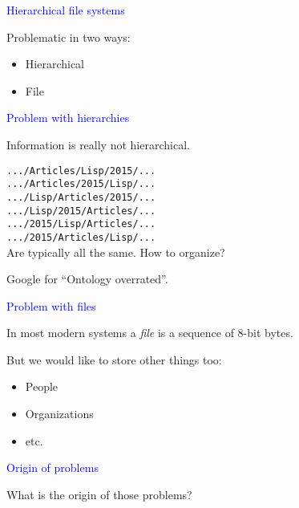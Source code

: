 \documentclass{slides}
\newcommand{\ti}[1]{\begin{center}\Large{\textcolor{blue}{#1}}\end{center}}
\begin{document}
\begin{slide}\ti{Hierarchical file systems}
\vskip 0.5cm
Problematic in two ways:

\begin{itemize}
\item Hierarchical
\item File
\end{itemize}

\vfill\end{slide}
\begin{slide}\ti{Problem with hierarchies}
\vskip 0.5cm
Information is really not hierarchical. 

\texttt{.../Articles/Lisp/2015/...}\\
\texttt{.../Articles/2015/Lisp/...}\\
\texttt{.../Lisp/Articles/2015/...}\\
\texttt{.../Lisp/2015/Articles/...}\\
\texttt{.../2015/Lisp/Articles/...}\\
\texttt{.../2015/Articles/Lisp/...}\\

Are typically all the same.  How to organize?

Google for ``Ontology overrated''.

\vfill\end{slide}
\begin{slide}\ti{Problem with files}
\vskip 0.5cm
In most modern systems a \emph{file} is a sequence of 8-bit bytes.

But we would like to store other things too:

\begin{itemize}
\item People
\item Organizations
\item etc.
\end{itemize}

\vfill\end{slide}
\begin{slide}\ti{Origin of problems}

What is the origin of those problems?

\vfill\end{slide}
\end{document}
